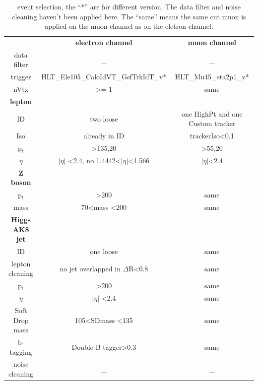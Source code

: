 \documentclass{article}
\newcommand\ChangeRT[1]{\noalign{\hrule height #1}}
\begin{document}
\begin{table}[]
\caption{event selection, the ``*'' are for different version. The data filter and noise cleaning haven't been applied here. The ``same'' means the same cut muon is applied on the muon channel as on the eletron channel.}
\label{my-label}
\centering
\setlength{\tabcolsep}{8pt}
\begin{tabular}{ c c c }
\textbf{ }      &  \textbf {electron channel} & \textbf{muon channel}     \\ \ChangeRT{1.5pt}
\hline
data filter     & { \_ } 		      & { \_ } \\
trigger         & HLT\_Ele105\_CaloIdVT\_GsfTrkIdT\_v*  & HLT\_Mu45\_eta2p1\_v* \\
nVtx            & { \textgreater= 1} 	      & {same } \\
\hline 
\textbf {lepton}& { } 			      & { } \\   
ID     		& { two loose } 	      & { one HighPt and one Custom tracker } \\
Iso    		& { already in ID} 	      & { trackerIso\textless0.1} \\
p$_{t}$     		& { \textgreater135,20}       & { \textgreater55,20} \\
$\eta$    	& $|\eta|$  \textless2.4, no 1.4442\textless$|\eta|$\textless1.566  & { $|\eta|$\textless2.4} \\
\hline 
\textbf {Z boson} & { } 		      & { } \\ 
p$_{t}$   	   	& { \textgreater200} 	      & { same} \\
mass 	   	& { 70\textless mass \textless200} & { same } \\
\hline 
\textbf {Higgs AK8 jet} & { } 	    	      & { } \\
ID              & { one loose } 	      & { same } \\
lepton cleaning & { no jet overlapped in      $\Delta$R\textless0.8 } & { same } \\
p$_{t}$              & { \textgreater200} 	      & same \\
$\eta$          & $|\eta|$  \textless2.4      & same \\
Soft Drop mass  & { 105\textless SDmass \textless135 } & { same } \\
b-tagging       & { Double B-tagger\textgreater0.3} & {same } \\
\hline
noise cleaning  & { \_ } 		      & { \_ } \\

\end{tabular}
\end{table}
\end{document}
